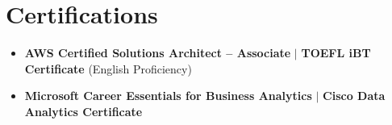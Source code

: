 \documentclass[a4paper,10pt]{article}
\begin{document}
\section{Certifications}
\begin{itemize}[nosep, leftmargin=2em]
\item \textbf{AWS Certified Solutions Architect – Associate} $|$ \textbf{TOEFL iBT Certificate} (English Proficiency)
\item \textbf{Microsoft Career Essentials for Business Analytics} $|$ \textbf{Cisco Data Analytics Certificate}
\end{itemize}
\end{document}
